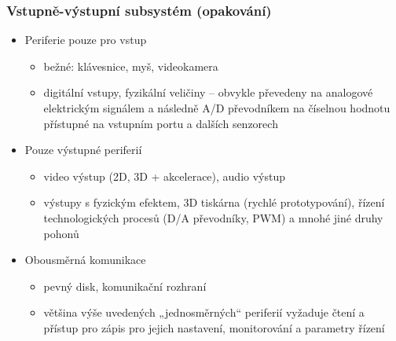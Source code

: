 \documentclass{beamer}
\begin{document}
\begin{frame}
\frametitle{Vstupně-výstupní subsystém (opakování)}

\begin{itemize}
 \item Periferie pouze pro vstup
 \begin{itemize}
  \item  bežné: klávesnice, myš, videokamera
  \item digitální vstupy, fyzikální veličiny -- obvykle převedeny na analogové
elektrickým signálem a následně A/D převodníkem na číselnou hodnotu
přístupné na vstupním portu a dalších senzorech
 \end{itemize}
\end{itemize}
\begin{itemize}
 \item Pouze výstupné periferií
 \begin{itemize}
  \item video výstup (2D, 3D + akcelerace), audio výstup
  \item výstupy s fyzickým efektem, 3D tiskárna (rychlé prototypování),
řízení technologických procesů (D/A převodníky, PWM) a mnohé
jiné druhy pohonů
 \end{itemize}
\end{itemize}
\begin{itemize}
 \item Obousměrná komunikace
 \begin{itemize}
  \item pevný disk, komunikační rozhraní
  \item většina výše uvedených „jednosměrných“ periferií vyžaduje čtení
a přístup pro zápis pro jejich nastavení, monitorování a parametry
řízení
 \end{itemize}
\end{itemize}
\end{frame}
\end{document}
